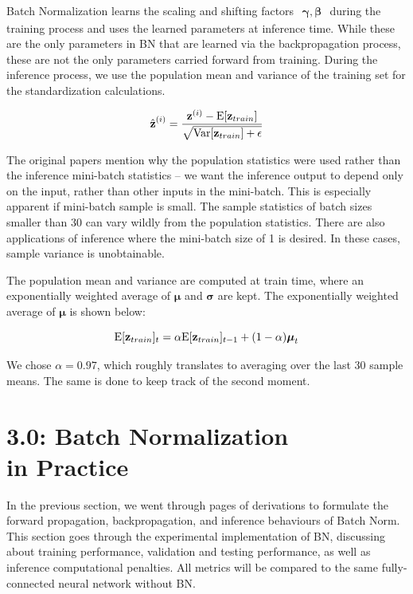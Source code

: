 \documentclass{article}
\begin{document}
\begin{multicols*}{2}
Batch Normalization learns the scaling and shifting factors $\begin{aligned}
    \boldsymbol{\gamma}, \boldsymbol{\beta}
\end{aligned}$ during the training process and uses the learned parameters at inference 
time. While these are the only parameters in BN that are learned via the 
backpropagation process, these are not the only parameters carried forward
from training. During the inference process, we use the population mean 
and variance of the training set for the standardization calculations.

\begin{equation}
    \hat{\textbf{z}}^{(i)} = {\textbf{z}^{(i)} - \text{E}[\textbf{z}_{train}] \over \sqrt{\text{Var}[\textbf{z}_{train}] + \epsilon}}
\end{equation}

The original papers\cite{batchnorm} mention why the population statistics were used rather 
than the inference mini-batch statistics -- we want the inference output
to depend only on the input, rather than other inputs in the mini-batch.
This is especially apparent if mini-batch sample is small. The sample statistics
of batch sizes smaller than 30\cite{CLT} can vary wildly from the population statistics.
There are also applications of inference where the mini-batch size of 1 is 
desired. In these cases, sample variance is unobtainable.

The population mean and variance are computed at train time, where an 
exponentially weighted average of $\boldsymbol{\mu}$ and $\boldsymbol{\sigma}$
are kept. The exponentially weighted average of $\boldsymbol{\mu}$ is shown below:

\begin{equation}
    \text{E}[\textbf{z}_{train}]_{t} = \alpha \text{E}[\textbf{z}_{train}]_{t-1} + (1-\alpha)\boldsymbol{\mu}_t\notag
\end{equation}

We chose $\alpha = 0.97$, which roughly translates to averaging over the 
last 30 sample means. The same is done to keep track of the second moment.

\section*{3.0: Batch Normalization \\in Practice}

In the previous section, we went through pages of derivations to formulate the 
forward propagation, backpropagation, and inference behaviours of Batch Norm.
This section goes through the experimental implementation of BN, discussing
about training performance, validation and testing performance, as well as
inference computational penalties. All metrics will be compared to the same 
fully-connected neural network without BN.


\end{multicols*}
\end{document}
